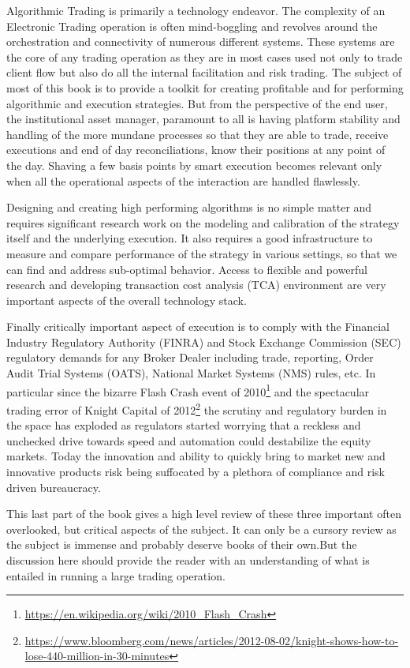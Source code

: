 
Algorithmic Trading is primarily a technology endeavor. The complexity of an Electronic Trading operation is often mind-boggling and revolves around the orchestration and connectivity of numerous different systems. These systems are the core of any trading operation as they are in most cases used not only to trade client flow but also do all the internal facilitation and risk trading. The subject of most of this book is to provide a toolkit for creating profitable and for performing algorithmic and execution strategies. But from the perspective of the end user, the institutional asset manager, paramount to all is having platform stability and handling of the more mundane processes so that they are able to trade, receive executions and end of day reconciliations, know their positions at any point of the day. Shaving a few basis points by smart execution becomes relevant only when all the operational aspects of the interaction are handled flawlessly.


Designing and creating high performing algorithms is no simple matter and requires significant research work on the modeling and calibration of the strategy itself and the underlying execution. It also requires a good infrastructure to measure and compare  performance of the strategy in various settings, so that we can find and address sub-optimal behavior. Access to flexible and powerful research and developing transaction cost analysis (TCA) environment are very important aspects of the overall technology stack.


Finally critically important aspect of execution is to comply with the Financial Industry Regulatory Authority (FINRA) and Stock Exchange Commission (SEC) regulatory demands for any Broker Dealer including trade, reporting, Order Audit Trial Systems (OATS), National Market Systems (NMS) rules, etc. In particular since the bizarre Flash Crash event of 2010\footnote{\url{https://en.wikipedia.org/wiki/2010_Flash_Crash}} and the spectacular trading error of Knight Capital of 2012\footnote{\url{https://www.bloomberg.com/news/articles/2012-08-02/knight-shows-how-to-lose-440-million-in-30-minutes}} the scrutiny and regulatory burden in the space has exploded as regulators started worrying that a reckless and unchecked drive towards speed and automation could destabilize the equity markets. Today the innovation and ability to quickly bring to market new and innovative products risk being suffocated by a plethora of compliance and risk driven bureaucracy. 


This last part of the book gives a high level review of these three important often overlooked, but critical aspects of the subject. It can only be a cursory review as the subject is immense and probably deserve books of their own.But the discussion here should provide the reader with an understanding of what is entailed in running a large trading operation.